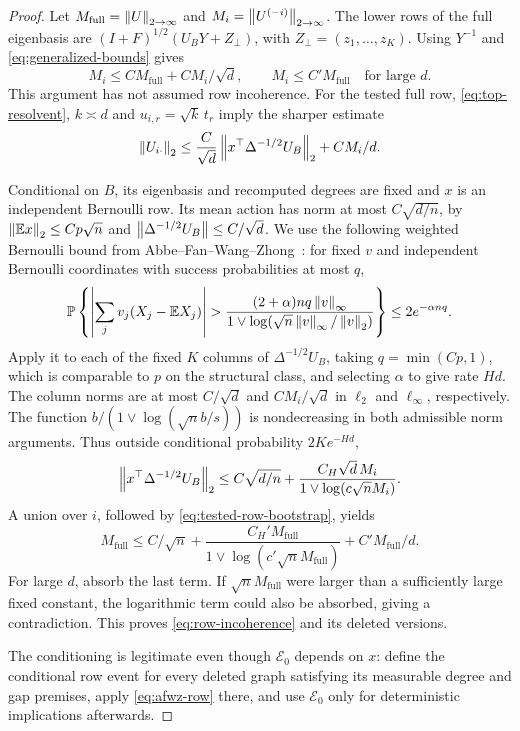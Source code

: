 \begin{proof}
Let $M_\mathrm{full}=\left\lVert U\right\rVert_{2\to\infty}$ and
$M_i=\left\lVert U^{(-i)}\right\rVert_{2\to\infty}$.
The lower rows of the full eigenbasis are
$(I+F)^{1/2}(U_BY+Z_\perp)$, with
$Z_\perp=(z_1,\ldots,z_K)$.
Using $Y^{-1}$ and \eqref{eq:generalized-bounds} gives
\[
 M_i\le C M_\mathrm{full}+CM_i/\sqrt d,
 \qquad M_i\le C' M_\mathrm{full}\quad\text{for large }d.
\]
This argument has not assumed row incoherence.
For the tested full row, \eqref{eq:top-resolvent}, $k\asymp d$ and
$u_{i,r}=\sqrt{k}\,t_r$ imply the sharper estimate
\begin{equation}\label{eq:tested-row-bootstrap}
 \left\lVert U_{i\cdot}\right\rVert_2
 \le\frac C{\sqrt d}\left\lVert x^\top\Delta^{-1/2}U_B\right\rVert_2+CM_i/d.
\end{equation}

Conditional on $B$, its eigenbasis and recomputed degrees are fixed and
$x$ is an independent Bernoulli row. Its mean action has norm at most
$C\sqrt{d/n}$, by $\left\lVert\mathbb E x\right\rVert_2\le Cp\sqrt n$ and
$\left\lVert\Delta^{-1/2}U_B\right\rVert\le C/\sqrt d$.
We use the following weighted Bernoulli bound from
Abbe--Fan--Wang--Zhong~\cite[Lemma 7, Eq.\ (C.2)]{afwz}:
for fixed $v$ and independent Bernoulli coordinates with success
probabilities at most $q$,
\begin{equation}\label{eq:afwz-row}
 \mathbb P\left\{\left|\sum_jv_j(X_j-\mathbb E X_j)\right|
 >\frac{(2+\alpha)nq\left\lVert v\right\rVert_\infty}
 {1\vee\log(\sqrt n\left\lVert v\right\rVert_\infty/\left\lVert v\right\rVert_2)}\right\}
 \le2e^{-\alpha nq}.
\end{equation}
Apply it to each of the fixed $K$ columns of $\Delta^{-1/2}U_B$, taking
$q=\min(Cp,1)$, which is comparable to $p$ on the structural class,
and selecting $\alpha$ to give rate $Hd$.
The column norms are at most $C/\sqrt d$ and $CM_i/\sqrt d$ in
$\ell_2$ and $\ell_\infty$, respectively. The function
$b/(1\vee\log(\sqrt n b/s))$ is nondecreasing in both admissible norm
arguments. Thus outside conditional probability $2Ke^{-Hd}$,
\[
 \left\lVert x^\top\Delta^{-1/2}U_B\right\rVert_2
 \le C\sqrt{d/n}+
 \frac{C_H\sqrt d\,M_i}{1\vee\log(c\sqrt nM_i)}.
\]
A union over $i$, followed by \eqref{eq:tested-row-bootstrap}, yields
\[
 M_\mathrm{full}\le C/\sqrt n+
 \frac{C_H'M_\mathrm{full}}
 {1\vee\log(c'\sqrt nM_\mathrm{full})}
 +C'M_\mathrm{full}/d.
\]
For large $d$, absorb the last term. If $\sqrt nM_\mathrm{full}$ were
larger than a sufficiently large fixed constant, the logarithmic term
could also be absorbed, giving a contradiction. This proves
\eqref{eq:row-incoherence} and its deleted versions.

The conditioning is legitimate even though $\mathcal E_0$ depends on
$x$: define the conditional row event for every deleted graph satisfying
its measurable degree and gap premises, apply \eqref{eq:afwz-row} there,
and use $\mathcal E_0$ only for deterministic implications afterwards.


\end{proof}

